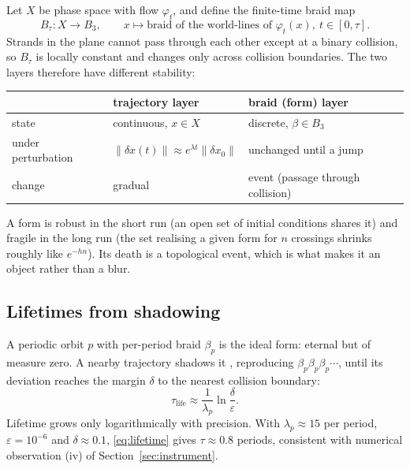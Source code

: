 \documentclass[11pt]{article}
\theoremstyle{remark}
\begin{document}
Let $X$ be phase space with flow $\varphi_t$, and define the finite-time braid map
\begin{equation}
  B_\tau:X\to B_3,\qquad x\mapsto\text{braid of the world-lines of }\varphi_t(x),\ t\in[0,\tau].
\end{equation}
Strands in the plane cannot pass through each other except at a binary collision, so $B_\tau$ is locally
constant and changes only across collision boundaries. The two layers therefore have different stability:

\begin{center}
\begin{tabular}{@{}lll@{}}
\toprule
& trajectory layer & braid (form) layer\\
\midrule
state & continuous, $x\in X$ & discrete, $\beta\in B_3$\\
under perturbation & $\|\delta x(t)\|\approx e^{\lambda t}\|\delta x_0\|$ & unchanged until a jump\\
change & gradual & event (passage through collision)\\
\bottomrule
\end{tabular}
\end{center}

\noindent A form is robust in the short run (an open set of initial conditions shares it) and fragile in the
long run (the set realising a given form for $n$ crossings shrinks roughly like $e^{-hn}$). Its death is a
topological event, which is what makes it an object rather than a blur.

\subsection{Lifetimes from shadowing}

A periodic orbit $p$ with per-period braid $\beta_p$ is the ideal form: eternal but of measure zero. A nearby
trajectory shadows it \cite{Bowen1975}, reproducing $\beta_p\beta_p\beta_p\cdots$, until its deviation reaches
the margin $\delta$ to the nearest collision boundary:
\begin{equation}
  \tau_{\text{life}}\approx\frac1{\lambda_p}\ln\frac{\delta}{\varepsilon}.
  \label{eq:lifetime}
\end{equation}
Lifetime grows only logarithmically with precision. With $\lambda_p\approx15$ per period, $\varepsilon=10^{-6}$
and $\delta\approx0.1$, \eqref{eq:lifetime} gives $\tau\approx0.8$ periods, consistent with numerical
observation (iv) of Section~\ref{sec:instrument}.
\end{document}
